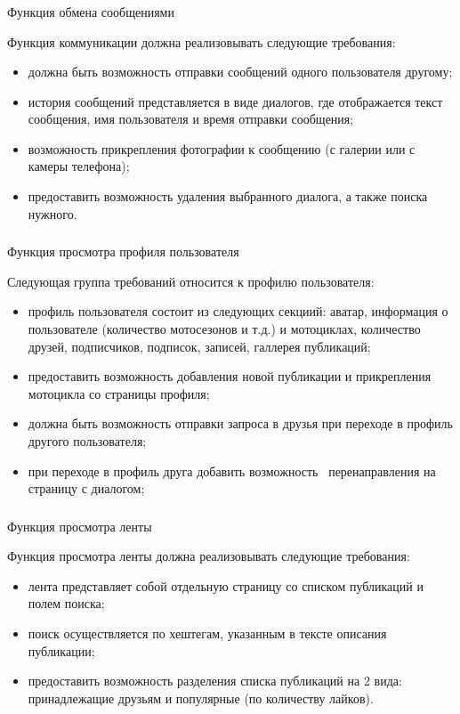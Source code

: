 \subsubsection{} Функция обмена сообщениями
\label{sec:domain:specification:messages}

Функция коммуникации должна реализовывать следующие требования:
\begin{itemize}
	\item должна быть возможность отправки сообщений одного пользователя другому;
	\item история сообщений представляется в виде диалогов, где отображается текст сообщения, имя пользователя и время отправки сообщения;
	\item возможность прикрепления фотографии к сообщению (с галерии или с камеры телефона);
	\item предоставить возможность удаления выбранного диалога, а также поиска нужного.
\end{itemize}

\subsubsection{} Функция просмотра профиля пользователя
\label{sec:domain:specification:student_history}

Следующая группа требований относится к профилю пользователя:
\begin{itemize}
	\item профиль пользователя состоит из следующих секциий: аватар, информация о пользователе (количество мотосезонов и т.д.) и мотоциклах, количество друзей, подписчиков, подписок, записей, галлерея публикаций;
	\item предоставить возможность добавления новой публикации и прикрепления мотоцикла со страницы профиля;
	\item должна быть возможность отправки запроса в друзья при переходе в профиль другого пользователя;
	\item при переходе в профиль друга добавить возможность  перенаправления на страницу с диалогом;
\end{itemize}

\subsubsection{} Функция просмотра ленты
\label{sec:domain:specification:student_history}

Функция просмотра ленты должна реализовывать следующие требования:
\begin{itemize}
	\item лента представляет собой отдельную страницу со списком публикаций и полем поиска;
	\item поиск осуществляется по хештегам, указанным в тексте описания публикации;
	\item предоставить возможность разделения списка публикаций на 2 вида: принадлежащие друзьям и популярные (по количеству лайков).
\end{itemize}

